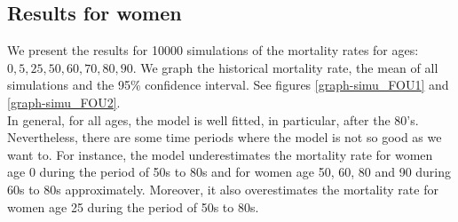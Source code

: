 \documentclass[12pt,reqno]{amsart}
\theoremstyle{definition}
\theoremstyle{remark}
\numberwithin{equation}{section}
\begin{document}
\subsection{Results for women}\label{re-wom}

We present the results for 10000 simulations of the mortality rates for ages: $0,5,25,50,60,70,80,90$.
We graph the historical mortality rate, the mean of all simulations and the 95\% confidence interval. See figures \ref{graph-simu_FOU1} and  \ref{graph-simu_FOU2}.\\

In general, for all ages, the model is well fitted, in particular, after the 80's. Nevertheless, there are some time periods where the model is not
so good as we want to. For instance, the model underestimates the mortality rate for women age 0 during the period of 50s to 80s and for women age 50, 60, 80 and 90 during
60s to 80s approximately. Moreover, it also overestimates the mortality rate for
women age 25 during the period of 50s to 80s.
\end{document}
